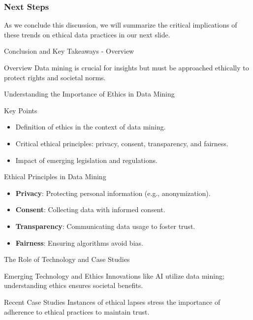 \documentclass[aspectratio=169]{beamer}
\begin{document}
\begin{frame}[fragile]
    \frametitle{Next Steps}
    As we conclude this discussion, we will summarize the critical implications of these trends on ethical data practices in our next slide.
\end{frame}

\begin{frame}[fragile]{Conclusion and Key Takeaways - Overview}
  \begin{block}{Overview}
    Data mining is crucial for insights but must be approached ethically to protect rights and societal norms.
  \end{block}
\end{frame}

\begin{frame}[fragile]{Understanding the Importance of Ethics in Data Mining}
  \begin{block}{Key Points}
    \begin{itemize}
      \item Definition of ethics in the context of data mining.
      \item Critical ethical principles: privacy, consent, transparency, and fairness.
      \item Impact of emerging legislation and regulations.
    \end{itemize}
  \end{block}
\end{frame}

\begin{frame}[fragile]{Ethical Principles in Data Mining}
  \begin{itemize}
    \item \textbf{Privacy}: Protecting personal information (e.g., anonymization).
    \item \textbf{Consent}: Collecting data with informed consent.
    \item \textbf{Transparency}: Communicating data usage to foster trust.
    \item \textbf{Fairness}: Ensuring algorithms avoid bias.
  \end{itemize}
\end{frame}

\begin{frame}[fragile]{The Role of Technology and Case Studies}
  \begin{block}{Emerging Technology and Ethics}
    Innovations like AI utilize data mining; understanding ethics ensures societal benefits.
  \end{block}
  
  \begin{exampleblock}{Recent Case Studies}
    Instances of ethical lapses stress the importance of adherence to ethical practices to maintain trust.
  \end{exampleblock}
\end{frame}
\end{document}
